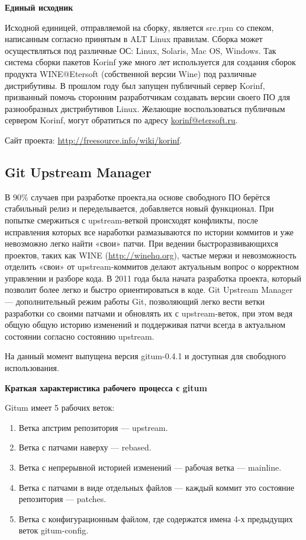 \documentclass[10pt, a5paper]{article}
\begin{document}
\textbf{Единый исходник}

Исходной единицей, отправляемой на сборку, является src.rpm со спеком, написанным согласно принятым в ALT Linux правилам.
Сборка может осуществляться под различные ОС: Linux, Solaris, Mac OS, Windows.
Так система сборки пакетов Korinf уже много лет используется для создания сборок продукта WINE@Etersoft (собственной версии Wine) под различные дистрибутивы. В прошлом году был запущен публичный сервер Korinf, призванный помочь сторонним разработчикам создавать версии своего ПО для разнообразных дистрибутивов Linux. Желающие воспользоваться публичным сервером Korinf, могут обратиться по адресу \url{korinf@etersoft.ru}.

Сайт проекта: \url{http://freesource.info/wiki/korinf}.

\subsection*{Git Upstream Manager}

В 90\% случаев при разработке проекта,на основе свободного ПО берётся стабильный релиз и переделывается, добавляется новый функционал. При попытке смержиться с upstream-веткой происходят конфликты, после исправления которых все наработки размазываются по истории коммитов и уже невозможно легко найти «свои» патчи. При ведении быстроразвивающихся проектов, таких как WINE (\url{http://winehq.org}), частые мержи и невозможность отделить «свои» от upstream-коммитов делают актуальным вопрос о корректном управлении и разборе кода. В 2011 года была начата разработка проекта, который позволит более легко и быстро ориентироваться в коде.
Git Upstream Manager --- дополнительный режим работы Git, позволяющий легко вести ветки разработки со своими патчами и обновлять их с upstream-веток, при этом ведя общую общую историю изменений и поддерживая патчи всегда в актуальном состоянии согласно состоянию upstream.

На данный момент выпущена версия gitum-0.4.1 и доступная для свободного использования.

\textbf{Краткая характеристика рабочего процесса с gitum}

Gitum имеет 5 рабочих веток:

\begin{enumerate}
  \item Ветка апстрим репозитория --- upstream.
  \item Ветка с патчами наверху --- rebased.
  \item Ветка с непрерывной историей изменений --- рабочая ветка --- mainline.
  \item Ветка с патчами в виде отдельных файлов --- каждый коммит это состояние репозитория --- patches.
  \item Ветка с конфигурационным файлом, где содержатся имена 4-х предыдущих веток gitum-config.
  \end{enumerate}
\end{document}
